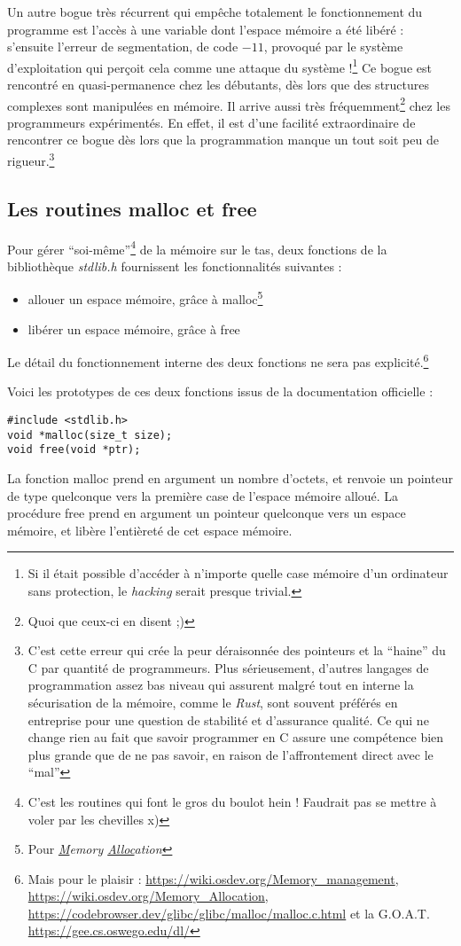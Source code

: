 \documentclass[../../../main.tex]{subfiles}
\begin{document}
Un autre bogue très récurrent qui empêche totalement le fonctionnement du programme est l'accès à une variable dont l'espace mémoire a été libéré : s'ensuite l'erreur de segmentation, de code $-11$, provoqué par le système d'exploitation qui perçoit cela comme une attaque du système !\footnote{Si il était possible d'accéder à n'importe quelle case mémoire d'un ordinateur sans protection, le \textit{hacking} serait presque trivial.} Ce bogue est rencontré en quasi-permanence chez les débutants, dès lors que des structures complexes sont manipulées en mémoire. Il arrive aussi très fréquemment\footnote{Quoi que ceux-ci en disent ;)} chez les programmeurs expérimentés. En effet, il est d'une facilité extraordinaire de rencontrer ce bogue dès lors que la programmation manque un tout soit peu de rigueur.\footnote{C'est cette erreur qui crée la peur déraisonnée des pointeurs et la ``haine'' du C par quantité de programmeurs. Plus sérieusement, d'autres langages de programmation assez bas niveau qui assurent malgré tout en interne la sécurisation de la mémoire, comme le \textit{Rust}, sont souvent préférés en entreprise pour une question de stabilité et d'assurance qualité. Ce qui ne change rien au fait que savoir programmer en C assure une compétence bien plus grande que de ne pas savoir, en raison de l'affrontement direct avec le ``mal''}
\subsection{Les routines \textsf{malloc} et \textsf{free}}
Pour gérer ``soi-même''\footnote{C'est les routines qui font le gros du boulot hein ! Faudrait pas se mettre à voler par les chevilles x)} de la mémoire sur le tas, deux fonctions de la bibliothèque \textit{stdlib.h} fournissent les fonctionnalités suivantes :
\begin{itemize}
	\item allouer un espace mémoire, grâce à \textsf{malloc}\footnote{Pour \textit{\underline{M}emory \underline{Alloc}ation}}
	\item libérer un espace mémoire, grâce à \textsf{free}
\end{itemize}
Le détail du fonctionnement interne des deux fonctions ne sera pas explicité.\footnote{Mais pour le plaisir : \url{https://wiki.osdev.org/Memory_management}, \url{https://wiki.osdev.org/Memory_Allocation}, \url{https://codebrowser.dev/glibc/glibc/malloc/malloc.c.html} et la G.O.A.T. \url{https://gee.cs.oswego.edu/dl/}}
 
Voici les prototypes de ces deux fonctions issus de la documentation officielle :
\begin{verbatim}
#include <stdlib.h>
void *malloc(size_t size);
void free(void *ptr);
\end{verbatim}
La fonction \textsf{malloc} prend en argument un nombre d'octets, et renvoie un pointeur de type quelconque vers la première case de l'espace mémoire alloué. La procédure \textsf{free} prend en argument un pointeur quelconque vers un espace mémoire, et libère l'entièreté de cet espace mémoire.
 
\end{document}
